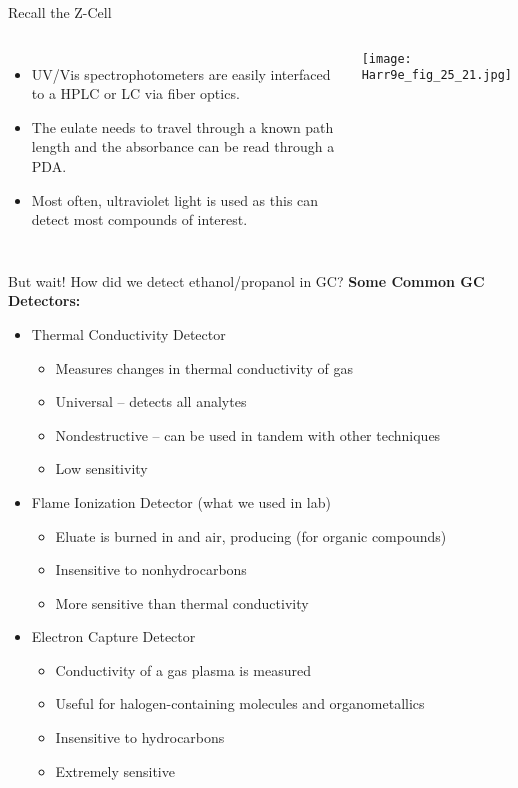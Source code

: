 \documentclass[handout]{beamer}
\begin{document}
\begin{frame}{Recall the Z-Cell}
	\begin{columns}
		\begin{itemize}
			\item UV/Vis spectrophotometers are easily interfaced to
				a HPLC or LC via fiber optics.
			\item The eulate needs to travel through a known path
				length and the absorbance can be read through
				a PDA.
			\item Most often, ultraviolet light is used as this can
				detect most compounds of interest.
		\end{itemize}
		\texttt{[image: Harr9e\_fig\_25\_21.jpg]}
	\end{columns}
\end{frame}

\begin{frame}{But wait! How did we detect ethanol/propanol in GC?}
	\textbf{Some Common GC Detectors:}
	\begin{itemize}
		\item Thermal Conductivity Detector
			\begin{itemize}
				\item Measures changes in thermal conductivity
					of gas
				\item Universal -- detects all analytes
				\item Nondestructive -- can be used \alert{in
					tandem} with other techniques
				\item Low sensitivity
			\end{itemize}
		\item \alert{Flame Ionization Detector} (what we used in lab)
			\begin{itemize}
				\item Eluate is burned in  and air,
					producing  (for organic
					compounds)
				\item Insensitive to nonhydrocarbons
				\item More sensitive than thermal conductivity
			\end{itemize}
		\item Electron Capture Detector
			\begin{itemize}
				\item Conductivity of a gas plasma is measured
				\item Useful for halogen-containing molecules
					and organometallics
				\item Insensitive to hydrocarbons
				\item Extremely sensitive
			\end{itemize}
	\end{itemize}
\end{frame}
\end{document}
